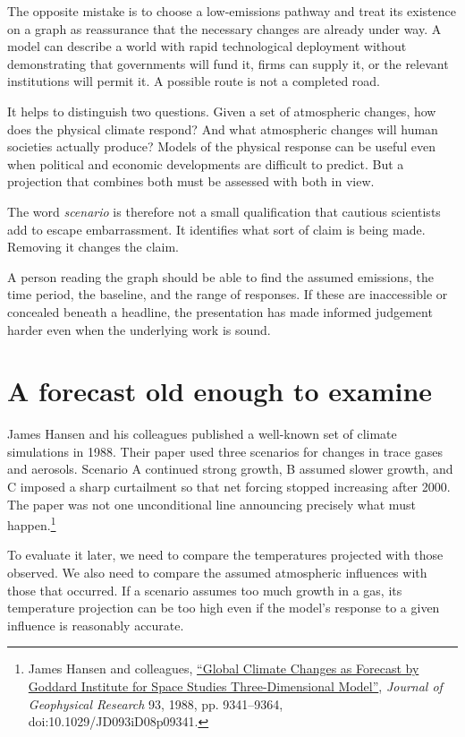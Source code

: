 \documentclass[12pt,a4paper]{book}
\begin{document}
The opposite mistake is to choose a low-emissions pathway and treat its existence on a graph as reassurance that the necessary changes are already under way. A model can describe a world with rapid technological deployment without demonstrating that governments will fund it, firms can supply it, or the relevant institutions will permit it. A possible route is not a completed road.

It helps to distinguish two questions. Given a set of atmospheric changes, how does the physical climate respond? And what atmospheric changes will human societies actually produce? Models of the physical response can be useful even when political and economic developments are difficult to predict. But a projection that combines both must be assessed with both in view.

The word \emph{scenario} is therefore not a small qualification that cautious scientists add to escape embarrassment. It identifies what sort of claim is being made. Removing it changes the claim.

A person reading the graph should be able to find the assumed emissions, the time period, the baseline, and the range of responses. If these are inaccessible or concealed beneath a headline, the presentation has made informed judgement harder even when the underlying work is sound.

\section*{A forecast old enough to examine}

James Hansen and his colleagues published a well-known set of climate simulations in 1988. Their paper used three scenarios for changes in trace gases and aerosols. Scenario A continued strong growth, B assumed slower growth, and C imposed a sharp curtailment so that net forcing stopped increasing after 2000. The paper was not one unconditional line announcing precisely what must happen.\footnote{James Hansen and colleagues, \href{https://www.giss.nasa.gov/pubs/abs/ha02700w.html}{``Global Climate Changes as Forecast by Goddard Institute for Space Studies Three-Dimensional Model''}, \emph{Journal of Geophysical Research} 93, 1988, pp. 9341--9364, doi:10.1029/JD093iD08p09341.}

To evaluate it later, we need to compare the temperatures projected with those observed. We also need to compare the assumed atmospheric influences with those that occurred. If a scenario assumes too much growth in a gas, its temperature projection can be too high even if the model's response to a given influence is reasonably accurate.
\end{document}
